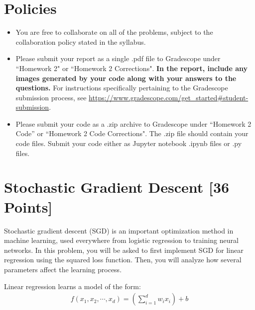 \newif\ifshowsolutions
\showsolutionsfalse




\pagestyle{fancy}

\section*{Policies}
\begin{itemize}
	\item You are free to collaborate on all of the problems, subject to the collaboration policy stated in the syllabus.
	\item Please submit your report as a single .pdf file to Gradescope under ``Homework 2" or ``Homework 2 Corrections".
	      \textbf{In the report, include any images generated by your code along with your answers to the questions.}
	      For instructions specifically pertaining to the Gradescope submission process, see \url{https://www.gradescope.com/get_started#student-submission}.
	\item Please submit your code as a .zip archive to Gradescope under ``Homework 2 Code'' or ``Homework 2 Code Corrections".
	      The .zip file should contain your code files.
	      Submit your code either as Jupyter notebook .ipynb files or .py files.
\end{itemize}

\newpage
\section{Stochastic Gradient Descent [36 Points]}

Stochastic gradient descent (SGD) is an important optimization method in machine learning, used everywhere from logistic regression to training neural networks.
In this problem, you will be asked to first implement SGD for linear regression using the squared loss function.
Then, you will analyze how several parameters affect the learning process.

Linear regression learns a model of the form:
\begin{align*}
	f(x_1, x_2, \cdots, x_d) = \left(\sum_{i=1}^d w_i x_i\right) + b
\end{align*}

